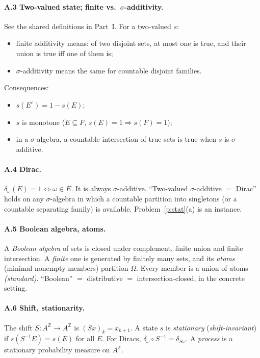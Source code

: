 \documentclass[11pt]{article}
\theoremstyle{definition}
\theoremstyle{remark}
\newcommand{\bbZ}{\mathbb{Z}}
\begin{document}
\paragraph{A.3 Two-valued state; finite vs.\ $\sigma$-additivity.} See the shared
definitions in Part~I. For a two-valued $s$:
\begin{itemize}[nosep]
\item finite additivity means: of two disjoint sets, at most one is true, and
  their union is true iff one of them is;
\item $\sigma$-additivity means the same for countable disjoint families.
\end{itemize}
Consequences:
\begin{itemize}[nosep]
\item $s(E^c)=1-s(E)$;
\item $s$ is monotone ($E\subseteq F$, $s(E)=1\Rightarrow s(F)=1$);
\item in a $\sigma$-algebra, a countable intersection of true sets is true when
  $s$ is $\sigma$-additive.
\end{itemize}

\paragraph{A.4 Dirac.} $\delta_\omega(E)=1\iff\omega\in E$. It is always
$\sigma$-additive. ``Two-valued $\sigma$-additive $=$ Dirac'' holds on any
$\sigma$-algebra in which a countable partition into singletons (or a countable
separating family) is available. Problem~\ref{p:stat}(a) is an instance.

\paragraph{A.5 Boolean algebra, atoms.} A \emph{Boolean algebra} of sets is closed
under complement, finite union and finite intersection. A \emph{finite} one is
generated by finitely many sets, and its \emph{atoms} (minimal nonempty members)
partition $\Omega$. Every member is a union of atoms
\emph{(standard)}. ``Boolean'' $=$ distributive $=$ intersection-closed, in the
concrete setting.

\paragraph{A.6 Shift, stationarity.} The shift $S:A^{\bbZ}\to A^{\bbZ}$ is
$(Sx)_k=x_{k+1}$. A state $s$ is \emph{stationary} (\emph{shift-invariant}) if
$s(S^{-1}E)=s(E)$ for all $E$. For Diracs, $\delta_\omega\circ
S^{-1}=\delta_{S\omega}$. A \emph{process} is a stationary probability measure on
$A^{\bbZ}$.
\end{document}
